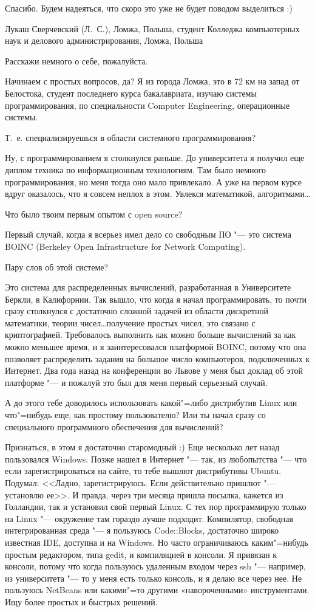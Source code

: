 \documentclass[10pt, a5paper]{article}
\begin{document}
\q Спасибо. Будем надеяться, что скоро это уже не будет поводом выделиться :)

\interview Лукаш Сверчевский (Л.~С.), Ломжа, Польша, студент Колледжа компьютерных наук и делового администрирования, Ломжа, Польша

\q Расскажи немного о себе, пожалуйста.

\a Начинаем с простых вопросов, да? Я из города Ломжа, это в 72 км на запад от Белостока, студент последнего курса бакалавриата, изучаю системы программирования,  по специальности Computer Engineering, операционные системы. 

\q Т.~е. специализируешься в области системного программирования?

\a Ну, с программированием я столкнулся раньше. До университета я получил еще диплом техника по информационным технологиям. Там было немного программирования, но меня тогда оно мало привлекало. А уже на первом курсе вдруг оказалось, что я совсем неплох в этом. Увлекся математикой, алгоритмами\ldots

\q Что было твоим первым опытом с open source?

\a Первый случай, когда я всерьез имел дело со свободным ПО "--- это система BOINC (Berkeley Open Infrastructure for Network Computing). 

\q Пару слов об этой системе?

\a Это система для распределенных вычислений, разработанная в Университете Беркли, в Калифорнии. Так вышло, что когда я начал программировать, то почти сразу столкнулся с достаточно сложной задачей из области дискретной математики, теории чисел\ldots получение простых чисел, это связано с криптографией. Требовалось выполнить как можно больше вычислений за как можно меньшее время, и я заинтересовался платформой BOINC, потому что она позволяет распределить задания на большое число компьютеров, подключенных к Интернет. Два года назад на конференции во Львове у меня был доклад об этой платформе "--- и пожалуй это был для меня первый серьезный случай.

\q А до этого тебе доводилось использовать какой"=либо дистрибутив Linux или что"=нибудь еще, как простому пользователю? Или ты начал сразу со специального программного обеспечения для вычислений?

\a Признаться, в этом я достаточно старомодный :) Еще несколько лет назад пользовался Windows. Позже нашел в Интернет "--- так, из любопытства "--- что если зарегистрироваться на сайте, то тебе вышлют дистрибутивы Ubuntu. Подумал: <<Ладно, зарегистрируюсь. Если действительно пришлют "--- установлю ее>>. И правда, через три месяца пришла посылка, кажется из Голландии, так и установил свой первый Linux. С тех пор программирую только на Linux "--- окружение там гораздо лучше подходит. Компилятор, свободная интегрированная среда "--- я пользуюсь Code::Blocks, достаточно широко известная IDE, доступна и на Windows. Но часто ограничиваюсь каким"=нибудь простым редактором, типа gedit, и компиляцией в консоли. Я привязан к консоли, потому что когда пользуюсь удаленным входом через ssh "--- например, из университета "--- то у меня есть только консоль, и я делаю все через нее. Не пользуюсь NetBeans или какими"=то другими «навороченными» инструментами. Ищу более простых и быстрых решений.
\end{document}
